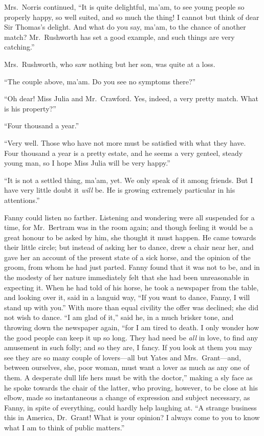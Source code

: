 \documentclass{article}
\begin{document}
Mrs.\ Norris continued, ``It is quite delightful, ma'am, to
see young people so properly happy, so well suited,
and so much the thing!  I cannot but think of dear Sir
Thomas's delight.  And what do you say, ma'am, to the chance
of another match?  Mr.\ Rushworth has set a good example,
and such things are very catching.''

Mrs.\ Rushworth, who saw nothing but her son, was quite
at a loss.

``The couple above, ma'am. Do you see no symptoms there?''

``Oh dear!  Miss Julia and Mr.\ Crawford.  Yes, indeed,
a very pretty match.  What is his property?''

``Four thousand a year.''

``Very well.  Those who have not more must be satisfied with
what they have.  Four thousand a year is a pretty estate,
and he seems a very genteel, steady young man, so I hope
Miss Julia will be very happy.''

``It is not a settled thing, ma'am, yet.  We only speak of it
among friends.  But I have very little doubt it \emph{will} be.
He is growing extremely particular in his attentions.''

Fanny could listen no farther.  Listening and wondering were all
suspended for a time, for Mr.\ Bertram was in the room again;
and though feeling it would be a great honour to be asked
by him, she thought it must happen.  He came towards
their little circle; but instead of asking her to dance,
drew a chair near her, and gave her an account of the present
state of a sick horse, and the opinion of the groom,
from whom he had just parted.  Fanny found that it was
not to be, and in the modesty of her nature immediately
felt that she had been unreasonable in expecting it.
When he had told of his horse, he took a newspaper from
the table, and looking over it, said in a languid way,
``If you want to dance, Fanny, I will stand up with you.''
With more than equal civility the offer was declined;
she did not wish to dance.  ``I am glad of it,'' said he,
in a much brisker tone, and throwing down the newspaper
again, ``for I am tired to death.  I only wonder how
the good people can keep it up so long.  They had need
be \emph{all} in love, to find any amusement in such folly;
and so they are, I fancy.  If you look at them you may
see they are so many couple of lovers---all but Yates
and Mrs.\ Grant---and, between ourselves, she, poor woman,
must want a lover as much as any one of them.  A desperate
dull life hers must be with the doctor,'' making a sly face
as he spoke towards the chair of the latter, who proving,
however, to be close at his elbow, made so instantaneous
a change of expression and subject necessary, as Fanny,
in spite of everything, could hardly help laughing at.
``A strange business this in America, Dr.\ Grant!  What is
your opinion?  I always come to you to know what I am to
think of public matters.''
\end{document}
